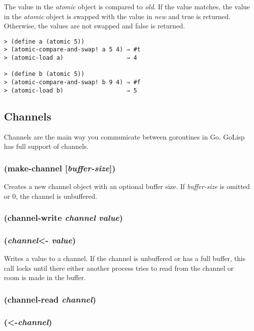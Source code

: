 \documentclass{article}
\begin{document}
The value in the \emph{atomic} object is compared to \emph{old}. If the value matches, the
value in the \emph{atomic} object is swapped with the value in \emph{new} and true is
returned. Otherwise, the values are not swapped and false is returned.

\begin{verbatim}
> (define a (atomic 5))
> (atomic-compare-and-swap! a 5 4) ⇒ #t
> (atomic-load a)                  ⇒ 4

> (define b (atomic 5))
> (atomic-compare-and-swap! b 9 4) ⇒ #f
> (atomic-load b)                  ⇒ 5
\end{verbatim}

\subsection{Channels}\label{sec:channels}

Channels are the main way you communicate between goroutines in Go. GoLisp has full support of
channels.

\subsubsection{(make-channel [\emph{buffer-size}])}

Creates a new channel object with an optional buffer size. If \emph{buffer-size} is omitted or
0, the channel is unbuffered.

\subsubsection{(channel-write \emph{channel} \emph{value})}

\subsubsection{(\emph{channel}\textless{}- \emph{value})}

Writes a value to a channel. If the channel is unbuffered or has a full buffer, this call
locks until there either another process tries to read from the channel or room is made in the
buffer.

\subsubsection{(channel-read \emph{channel})}

\subsubsection{(\textless{}-\emph{channel})}
\end{document}
